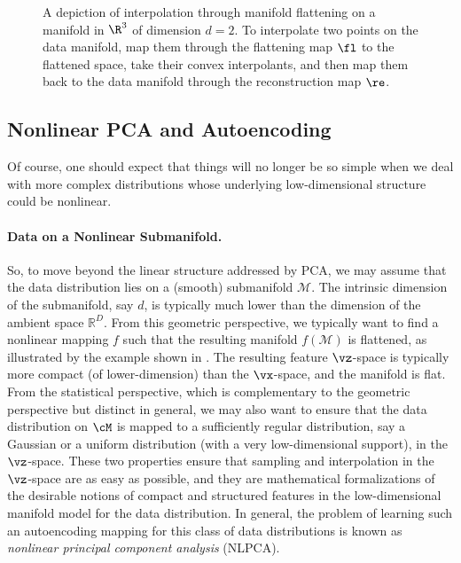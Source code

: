 \documentclass[../../book-main.tex]{subfiles}
\begin{document}
\begin{figure}
  \caption{A depiction of interpolation through manifold flattening
    on a manifold in \(\R^{3}\) of dimension \(d = 2\). To interpolate
    two points on the data manifold, map them through the flattening
    map \(\fl\) to the flattened space, take their convex interpolants,
    and then map them back to the data manifold through the
  reconstruction map \(\re\).}
  \label{fig:idealized_interpolation}
\end{figure}

\subsection{Nonlinear PCA and Autoencoding}\label{sub:nonlinear-pca}\label{sec:NLPCA}
Of course, one should expect that things will no longer be so simple
when we deal with more complex distributions whose underlying
low-dimensional structure could be nonlinear.

\paragraph{Data on a Nonlinear Submanifold.} So, to move beyond the
linear structure addressed by PCA, we may assume that the data distribution lies on a (smooth) submanifold $\mathcal{M}$. The intrinsic dimension of the submanifold, say $d$, is typically much lower than the
dimension of the ambient space $\mathbb{R}^D$. From this geometric
perspective, we typically want to find a nonlinear mapping $f$ such that
the resulting manifold
$f(\mathcal{M})$ is flattened, as illustrated by the example shown in
. The resulting feature $\vz$-space
is typically
more compact (of lower-dimension) than the $\vx$-space, and the
manifold is flat.
From the statistical perspective, which is complementary to the geometric
perspective but distinct in general, we may also want to ensure that the data
distribution on $\cM$ is mapped to a sufficiently regular
distribution, say a Gaussian or a uniform distribution (with a 
very low-dimensional support), in the $\vz$-space. These two properties ensure that sampling and interpolation in the $\vz$-space are as easy as possible, and they are mathematical formalizations of the desirable
notions of compact and structured features in the low-dimensional manifold
model for the data distribution.
In general, the problem of learning such an autoencoding mapping for this class
of data distributions is known as {\em nonlinear principal component analysis}
(NLPCA).
\end{document}
